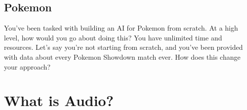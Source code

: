 \documentclass[11pt]{article}
\begin{document}
\subsection{Pokemon}
You've been tasked with building an AI for Pokemon from scratch. At a high level, how would you go about doing this? You have unlimited time and resources. 
Let's say you're not starting from scratch, and you've been provided with data about every Pokemon Showdown match ever. How does this change your approach?

\section{What is Audio?}
\end{document}
